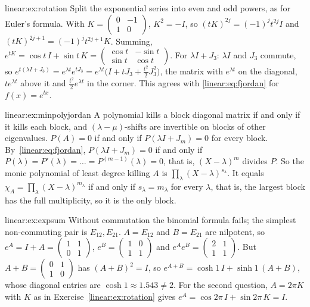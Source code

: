 \begin{solution}{linear:ex:rotation}
\idea Split the exponential series into even and odd powers, as for Euler's formula.
\writeup With $K=\begin{pmatrix}0&-1\\1&0\end{pmatrix}$, $K^2=-I$, so $(tK)^{2j}=(-1)^jt^{2j}I$ and $(tK)^{2j+1}=(-1)^jt^{2j+1}K$.
Summing, $e^{tK}=\cos t\,I+\sin t\,K=\begin{pmatrix}\cos t&-\sin t\\\sin t&\cos t\end{pmatrix}$. For $\lambda I+J_3$: $\lambda I$ and
$J_3$ commute, so $e^{t(\lambda I+J_3)}=e^{\lambda t}e^{tJ_3}=e^{\lambda t}\bigl(I+tJ_3+\tfrac{t^2}2J_3^2\bigr)$, the matrix with
$e^{\lambda t}$ on the diagonal, $te^{\lambda t}$ above it and $\frac{t^2}2e^{\lambda t}$ in the corner. This agrees with
\eqref{linear:eq:fjordan} for $f(x)=e^{tx}$.
\end{solution}

\begin{solution}{linear:ex:minpolyjordan}
\idea A polynomial kills a block diagonal matrix if and only if it kills each block, and $(\lambda-\mu)$-shifts are
invertible on blocks of other eigenvalues.
\writeup $P(A)=0$ if and only if $P(\lambda I+J_m)=0$ for every block. By~\eqref{linear:eq:fjordan}, $P(\lambda I+J_m)=0$ if and only if
$P(\lambda)=P'(\lambda)=\dots=P^{(m-1)}(\lambda)=0$, that is, $(X-\lambda)^m$ divides $P$. So the monic polynomial of least degree
killing $A$ is $\prod_\lambda(X-\lambda)^{s_\lambda}$. It equals $\chi_A=\prod_\lambda(X-\lambda)^{m_\lambda}$ if and only if $s_\lambda=m_\lambda$ for every
$\lambda$, that is, the largest block has the full multiplicity, so it is the only block.
\end{solution}

\begin{solution}{linear:ex:expsum}
\idea Without commutation the binomial formula fails; the simplest non-commuting pair is $E_{12},E_{21}$.
\writeup $A=E_{12}$ and $B=E_{21}$ are nilpotent, so $e^A=I+A=\begin{pmatrix}1&1\\0&1\end{pmatrix}$, $e^B=\begin{pmatrix}1&0\\1&1\end{pmatrix}$ and
$e^Ae^B=\begin{pmatrix}2&1\\1&1\end{pmatrix}$. But $A+B=\begin{pmatrix}0&1\\1&0\end{pmatrix}$ has $(A+B)^2=I$, so
$e^{A+B}=\cosh1\,I+\sinh1\,(A+B)$, whose diagonal entries are $\cosh1\approx1.543\ne2$. For the second question,
$A=2\pi K$ with $K$ as in Exercise~\ref{linear:ex:rotation} gives $e^A=\cos2\pi\,I+\sin2\pi\,K=I$.
\end{solution}

